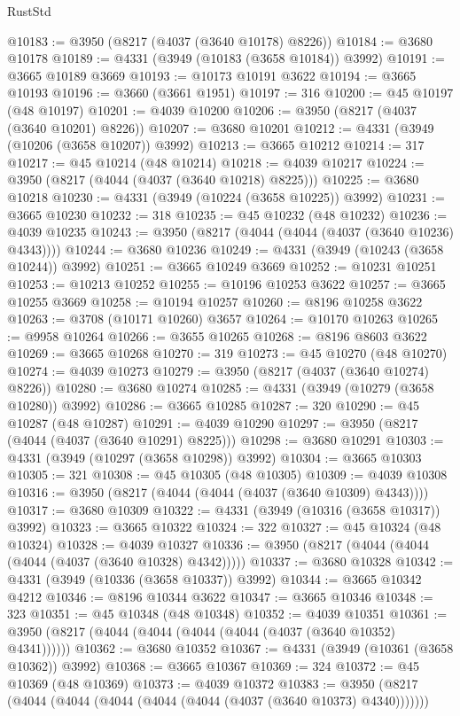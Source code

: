 \begin{lexlean}{RustStd}
\begin{coremodule}
@10183 := @3950 (@8217 (@4037 (@3640 @10178) @8226))
@10184 := @3680 @10178
@10189 := @4331 (@3949 (@10183 (@3658 @10184)) @3992)
@10191 := @3665 @10189 @3669
@10193 := @10173 @10191 @3622
@10194 := @3665 @10193
@10196 := @3660 (@3661 @1951)
@10197 := 316
@10200 := @45 @10197 (@48 @10197)
@10201 := @4039 @10200
@10206 := @3950 (@8217 (@4037 (@3640 @10201) @8226))
@10207 := @3680 @10201
@10212 := @4331 (@3949 (@10206 (@3658 @10207)) @3992)
@10213 := @3665 @10212
@10214 := 317
@10217 := @45 @10214 (@48 @10214)
@10218 := @4039 @10217
@10224 := @3950 (@8217 (@4044 (@4037 (@3640 @10218) @8225)))
@10225 := @3680 @10218
@10230 := @4331 (@3949 (@10224 (@3658 @10225)) @3992)
@10231 := @3665 @10230
@10232 := 318
@10235 := @45 @10232 (@48 @10232)
@10236 := @4039 @10235
@10243 := @3950 (@8217 (@4044 (@4044 (@4037 (@3640 @10236) @4343))))
@10244 := @3680 @10236
@10249 := @4331 (@3949 (@10243 (@3658 @10244)) @3992)
@10251 := @3665 @10249 @3669
@10252 := @10231 @10251
@10253 := @10213 @10252
@10255 := @10196 @10253 @3622
@10257 := @3665 @10255 @3669
@10258 := @10194 @10257
@10260 := @8196 @10258 @3622
@10263 := @3708 (@10171 @10260) @3657
@10264 := @10170 @10263
@10265 := @9958 @10264
@10266 := @3655 @10265
@10268 := @8196 @8603 @3622
@10269 := @3665 @10268
@10270 := 319
@10273 := @45 @10270 (@48 @10270)
@10274 := @4039 @10273
@10279 := @3950 (@8217 (@4037 (@3640 @10274) @8226))
@10280 := @3680 @10274
@10285 := @4331 (@3949 (@10279 (@3658 @10280)) @3992)
@10286 := @3665 @10285
@10287 := 320
@10290 := @45 @10287 (@48 @10287)
@10291 := @4039 @10290
@10297 := @3950 (@8217 (@4044 (@4037 (@3640 @10291) @8225)))
@10298 := @3680 @10291
@10303 := @4331 (@3949 (@10297 (@3658 @10298)) @3992)
@10304 := @3665 @10303
@10305 := 321
@10308 := @45 @10305 (@48 @10305)
@10309 := @4039 @10308
@10316 := @3950 (@8217 (@4044 (@4044 (@4037 (@3640 @10309) @4343))))
@10317 := @3680 @10309
@10322 := @4331 (@3949 (@10316 (@3658 @10317)) @3992)
@10323 := @3665 @10322
@10324 := 322
@10327 := @45 @10324 (@48 @10324)
@10328 := @4039 @10327
@10336 := @3950 (@8217 (@4044 (@4044 (@4044 (@4037 (@3640 @10328) @4342)))))
@10337 := @3680 @10328
@10342 := @4331 (@3949 (@10336 (@3658 @10337)) @3992)
@10344 := @3665 @10342 @4212
@10346 := @8196 @10344 @3622
@10347 := @3665 @10346
@10348 := 323
@10351 := @45 @10348 (@48 @10348)
@10352 := @4039 @10351
@10361 := @3950 (@8217 (@4044 (@4044 (@4044 (@4044 (@4037 (@3640 @10352) @4341))))))
@10362 := @3680 @10352
@10367 := @4331 (@3949 (@10361 (@3658 @10362)) @3992)
@10368 := @3665 @10367
@10369 := 324
@10372 := @45 @10369 (@48 @10369)
@10373 := @4039 @10372
@10383 := @3950 (@8217 (@4044 (@4044 (@4044 (@4044 (@4044 (@4037 (@3640 @10373) @4340)))))))

\end{coremodule}
\end{lexlean}
